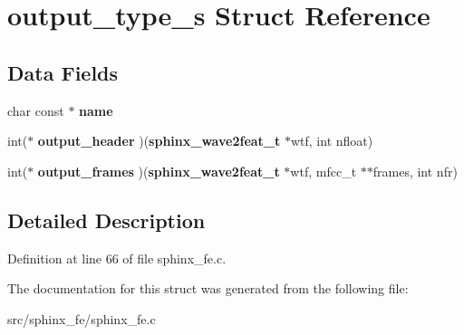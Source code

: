 \section{output\+\_\+type\+\_\+s Struct Reference}
\label{structoutput__type__s}
\subsection*{Data Fields}
\begin{DoxyCompactItemize}
\item 
char const $\ast$ {\bfseries name}\label{structoutput__type__s_a978f479360a30a64f9e151d75ec2bb4b}

\item 
int($\ast$ {\bfseries output\+\_\+header} )({\bf sphinx\+\_\+wave2feat\+\_\+t} $\ast$wtf, int nfloat)\label{structoutput__type__s_a150ba92b9d82aabb8e0087894ef5dba9}

\item 
int($\ast$ {\bfseries output\+\_\+frames} )({\bf sphinx\+\_\+wave2feat\+\_\+t} $\ast$wtf, mfcc\+\_\+t $\ast$$\ast$frames, int nfr)\label{structoutput__type__s_a2d46cc2b8de8a884037052bb271af232}

\end{DoxyCompactItemize}


\subsection{Detailed Description}


Definition at line 66 of file sphinx\+\_\+fe.\+c.



The documentation for this struct was generated from the following file\+:\begin{DoxyCompactItemize}
\item 
src/sphinx\+\_\+fe/sphinx\+\_\+fe.\+c\end{DoxyCompactItemize}
